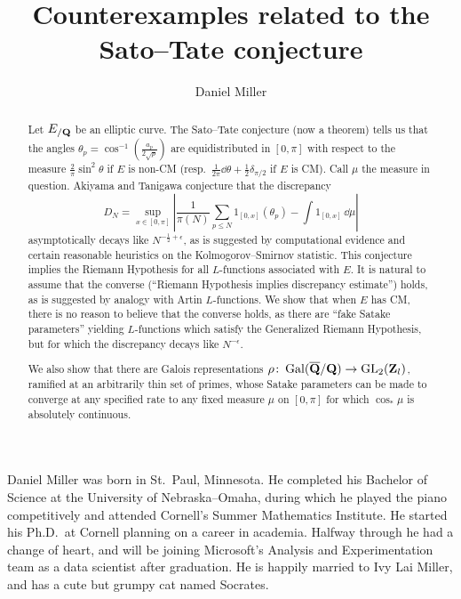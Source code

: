 \documentclass[phd,cornellheadings,tocprelim]{cornell}
\title{Counterexamples related to the Sato--Tate conjecture}
\author{Daniel Miller}
\begin{document}
\maketitle
\makecopyright

\begin{abstract}
Let $E_{/\mathbf{Q}}$ be an elliptic curve. The Sato--Tate conjecture (now a theorem) 
tells us that the angles $\theta_p =\cos^{-1}\left(\frac{a_p}{2\sqrt p}\right)$ 
are equidistributed in $[0,\pi]$ with respect to the measure 
$\frac{2}{\pi}\sin^2\theta$ if $E$ is non-CM
(resp.~$\frac{1}{2\pi} \dd \theta + \frac 1 2 \delta_{\pi/2}$ if $E$ is CM). 
Call $\mu$ the measure in question. Akiyama and Tanigawa conjecture that the 
discrepancy 
\[
	D_N = \sup_{x\in [0,\pi]} \left| \frac{1}{\pi(N)} \sum_{p\leqslant N} 1_{[0,x]}(\theta_p) - \int 1_{[0,x]} \, \dd\mu\right| 
\]
asymptotically decays like $N^{-\frac 1 2+\epsilon}$, as is suggested by computational 
evidence and certain reasonable heuristics on the Kolmogorov--Smirnov 
statistic. This conjecture implies the Riemann Hypothesis 
for all $L$-functions associated with $E$. It is natural to assume that the 
converse (``Riemann Hypothesis implies discrepancy estimate'') holds, as is 
suggested by analogy with Artin $L$-functions. We show that when $E$ has CM,
there is no reason to believe that the converse holds, as there are ``fake 
Satake parameters'' yielding $L$-functions which satisfy the Generalized 
Riemann Hypothesis, but for which the discrepancy decays like $N^{-\epsilon}$. 

We also show that there are Galois representations 
$\rho\colon \operatorname{Gal}(\overline {\mathbf{Q}} /\mathbf{Q}) \to \operatorname{GL}_2(\mathbf{Z}_l)$, ramified at an 
arbitrarily thin set of primes, whose Satake parameters can be made to 
converge at any specified rate to any fixed measure $\mu$ on $[0,\pi]$ for 
which $\cos_\ast\mu$ is absolutely continuous. 
\end{abstract}

\begin{biosketch}
Daniel Miller was born in St.~Paul, Minnesota. He completed his Bachelor of 
Science at the University of Nebraska--Omaha, during which he played the piano 
competitively and attended Cornell's Summer Mathematics Institute. He started 
his Ph.D.~at Cornell planning on a career in academia. Halfway through he had a 
change of heart, and will be joining Microsoft's Analysis and Experimentation 
team as a data scientist after graduation. He is happily married to Ivy 
Lai Miller, and has a cute but grumpy cat named Socrates. 
\end{biosketch}
\end{document}
